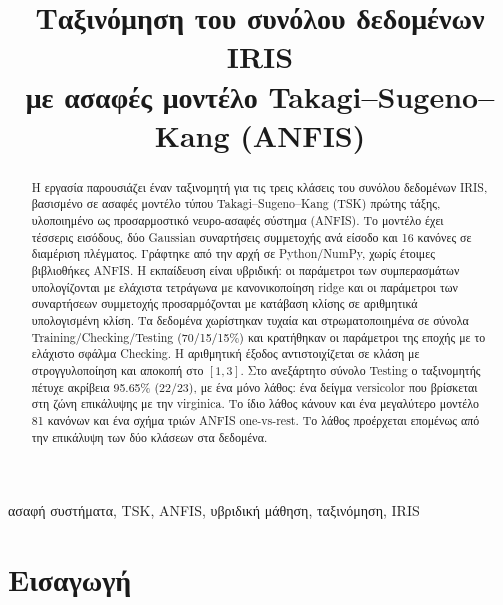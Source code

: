 \documentclass[conference]{IEEEtran}
\begin{document}
\title{Ταξινόμηση του συνόλου δεδομένων IRIS\\με ασαφές μοντέλο Takagi--Sugeno--Kang (ANFIS)}

\author{
}

\maketitle

\begin{abstract}
Η εργασία παρουσιάζει έναν ταξινομητή για τις τρεις κλάσεις του συνόλου δεδομένων
IRIS, βασισμένο σε ασαφές μοντέλο τύπου Takagi--Sugeno--Kang (TSK) πρώτης τάξης,
υλοποιημένο ως προσαρμοστικό νευρο-ασαφές σύστημα (ANFIS). Το μοντέλο έχει
τέσσερις εισόδους, δύο Gaussian συναρτήσεις συμμετοχής ανά είσοδο και 16 κανόνες
σε διαμέριση πλέγματος. Γράφτηκε από την αρχή σε Python/NumPy, χωρίς έτοιμες
βιβλιοθήκες ANFIS. Η εκπαίδευση είναι υβριδική: οι παράμετροι των
συμπερασμάτων υπολογίζονται με ελάχιστα τετράγωνα με κανονικοποίηση ridge
και οι παράμετροι των συναρτήσεων συμμετοχής προσαρμόζονται με κατάβαση κλίσης
σε αριθμητικά υπολογισμένη κλίση. Τα δεδομένα χωρίστηκαν τυχαία και
στρωματοποιημένα σε σύνολα Training/Checking/Testing (70/15/15\%) και κρατήθηκαν
οι παράμετροι της εποχής με το ελάχιστο σφάλμα Checking. Η αριθμητική έξοδος
αντιστοιχίζεται σε κλάση με στρογγυλοποίηση και αποκοπή στο $[1,3]$. Στο ανεξάρτητο
σύνολο Testing ο ταξινομητής πέτυχε ακρίβεια 95.65\% (22/23), με ένα μόνο λάθος:
ένα δείγμα versicolor που βρίσκεται στη ζώνη επικάλυψης με την virginica.
Το ίδιο λάθος κάνουν και ένα μεγαλύτερο μοντέλο 81 κανόνων και ένα σχήμα τριών
ANFIS one-vs-rest. Το λάθος προέρχεται επομένως από την επικάλυψη των δύο
κλάσεων στα δεδομένα.
\end{abstract}

\begin{IEEEkeywords}
ασαφή συστήματα, TSK, ANFIS, υβριδική μάθηση, ταξινόμηση, IRIS
\end{IEEEkeywords}

\section{Εισαγωγή}
\end{document}
